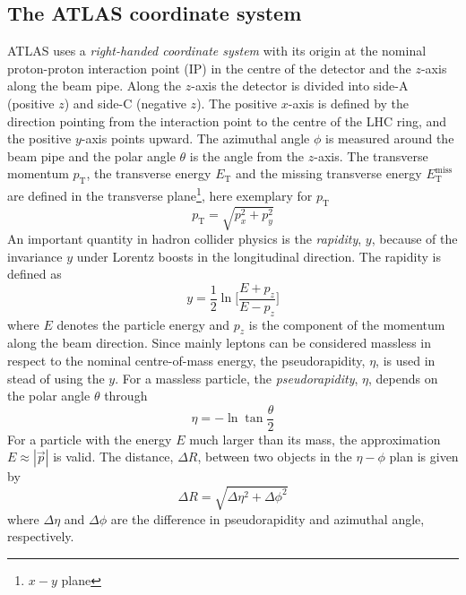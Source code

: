 \subsection{The ATLAS coordinate system}
\label{subsec:ae_atlas_coordinate}
ATLAS uses a \textit{right-handed coordinate system} with its origin at the nominal proton-proton interaction point (IP) in the centre of the detector and the $z$-axis along the beam pipe.
Along the $z$-axis the detector is divided into side-A (positive $z$) and side-C (negative $z$).
The positive $x$-axis is defined by the direction pointing from the interaction point to the centre of the LHC ring, and the positive $y$-axis points upward.%
The azimuthal angle $\phi$ is measured around the beam pipe  and the polar angle $\theta$ is the angle from the $z$-axis.
The transverse momentum $p_{\mathrm{T}}$, the transverse energy $E_{\mathrm{T}}$ and the missing transverse
energy $E_{\mathrm{T}}^{\mathrm{miss}}$ are defined in the transverse plane\footnote{$x-y$ plane}, here exemplary for $p_{\mathrm{T}}$
%
\begin{equation}
p_{\mathrm{T}}= \sqrt{p_{x}^{2} + p_{y}^{2}}
\end{equation}
%
An important quantity in hadron collider physics is the \textit{rapidity}, $y$, because of the invariance $y$ under Lorentz boosts in the longitudinal direction.
The rapidity is defined as
%
\begin{equation}
y = \frac{1}{2} \ln\Big[\frac{E + p_{z}}{E - p_{z}}\Big]
\end{equation}
%
where $E$ denotes the particle energy and $p_{z}$  is the component of the momentum along the beam direction.
Since mainly leptons can be considered massless in respect to the nominal centre-of-mass energy, the pseudorapidity, $\eta$, is used in stead of using the $y$.
For a massless particle, the \textit{pseudorapidity}, $\eta$, depends on the polar angle $\theta$ through
%
\begin{equation}
\eta = - \ln \tan \frac{\theta}{2}
\end{equation}
%
For a particle with the energy $E$ much larger than its mass, the approximation $E \approx |\vec{p}|$ is valid.
The distance, $\Delta R$, between two objects in the $\eta-\phi$ plan is given by
%
\begin{equation}
\Delta R = \sqrt{\Delta \eta^{2} + \Delta \phi^{2}}
\end{equation}
%
where $\Delta \eta$ and $\Delta \phi$ are the difference in pseudorapidity and azimuthal angle, respectively.

